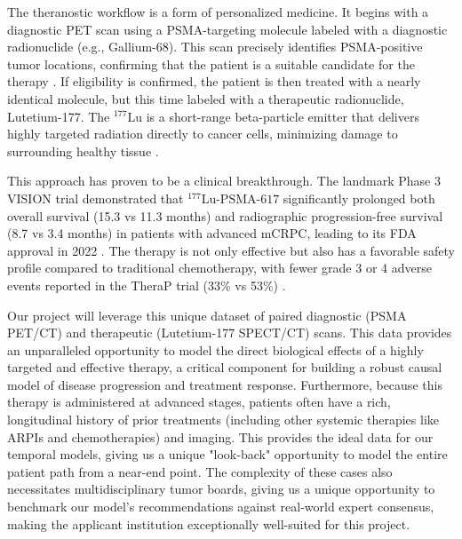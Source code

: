 \documentclass[11pt, a4paper]{article}
\begin{document}
The theranostic workflow is a form of personalized medicine. It begins with a diagnostic PET scan using a PSMA-targeting molecule labeled with a diagnostic radionuclide (e.g., Gallium-68). This scan precisely identifies PSMA-positive tumor locations, confirming that the patient is a suitable candidate for the therapy \cite{HennrichEder2022, KaewputVinjamuri2022}. If eligibility is confirmed, the patient is then treated with a nearly identical molecule, but this time labeled with a therapeutic radionuclide, Lutetium-177. The ${}^{177}\text{Lu}$ is a short-range beta-particle emitter that delivers highly targeted radiation directly to cancer cells, minimizing damage to surrounding healthy tissue \cite{HennrichEder2022, SadaghianiSheikhbahaei2022}.

This approach has proven to be a clinical breakthrough. The landmark Phase 3 VISION trial demonstrated that ${}^{177}\text{Lu-PSMA-617}$ significantly prolonged both overall survival (15.3 vs 11.3 months) and radiographic progression-free survival (8.7 vs 3.4 months) in patients with advanced mCRPC, leading to its FDA approval in 2022 \cite{TschanBorgna2022, ChandranFigg2022, RamnaraignSartor2023, JangKendi2023}. The therapy is not only effective but also has a favorable safety profile compared to traditional chemotherapy, with fewer grade 3 or 4 adverse events reported in the TheraP trial (33\% vs 53\%) \cite{HofmanEmmett2024, PatellKurian2023}.

Our project will leverage this unique dataset of paired diagnostic (PSMA PET/CT) and therapeutic (Lutetium-177 SPECT/CT) scans. This data provides an unparalleled opportunity to model the direct biological effects of a highly targeted and effective therapy, a critical component for building a robust causal model of disease progression and treatment response. Furthermore, because this therapy is administered at advanced stages, patients often have a rich, longitudinal history of prior treatments (including other systemic therapies like ARPIs and chemotherapies) and imaging. This provides the ideal data for our temporal models, giving us a unique "look-back" opportunity to model the entire patient path from a near-end point. The complexity of these cases also necessitates multidisciplinary tumor boards, giving us a unique opportunity to benchmark our model's recommendations against real-world expert consensus, making the applicant institution exceptionally well-suited for this project.
\end{document}
